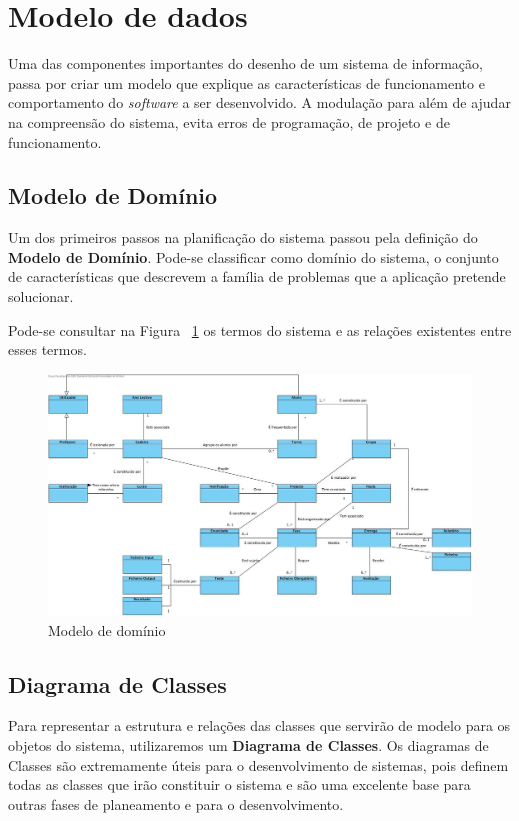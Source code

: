 \section{Modelo de dados}

Uma das componentes importantes do desenho de um sistema de informação, passa por criar um modelo que explique as características de funcionamento e comportamento do \textit{software} a ser desenvolvido. A modulação para além de ajudar na compreensão do sistema, evita erros de programação, de projeto e de funcionamento.

\subsection{Modelo de Domínio}

Um dos primeiros passos na planificação do sistema passou pela definição do \textbf{Modelo de Domínio}.
Pode-se classificar como domínio do sistema, o conjunto de características que descrevem a família de problemas que a aplicação pretende solucionar.

Pode-se consultar na Figura ~\ref{fig:modelo-dominio} os termos do sistema e as relações existentes entre esses termos.

\begin{figure}[H]
  \centering
  \includegraphics[width=1\textwidth,center]{images/modelo_dados/modelo-dominio}
  \caption{Modelo de domínio}
  \label{fig:modelo-dominio}
\end{figure}

\subsection{Diagrama de Classes}

Para representar a estrutura e relações das classes que servirão de modelo para os objetos do sistema, utilizaremos um \textbf{Diagrama de Classes}. Os diagramas de Classes são extremamente úteis para o desenvolvimento de sistemas, pois definem todas as classes que irão constituir o sistema e são uma excelente base para outras fases de planeamento e para o desenvolvimento.

